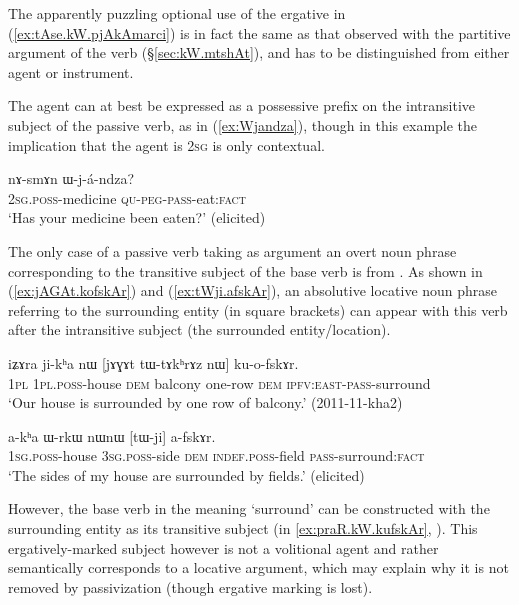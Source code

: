 The apparently puzzling optional use of the ergative in (\ref{ex:tAse.kW.pjAkAmarci}) is in fact the same as that observed with the partitive argument of the verb  (§\ref{sec:kW.mtshAt}), and has to be distinguished from either agent or instrument.

The agent can at best be expressed as a possessive prefix on the intransitive subject of the passive verb, as in (\ref{ex:Wjandza}), though in this example the implication that the agent is \textsc{2sg} is only contextual.

\begin{exe}
\ex \label{ex:Wjandza}
 \gll nɤ-smɤn ɯ-j-á-ndza? \\
 \textsc{2sg}.\textsc{poss}-medicine \textsc{qu}-\textsc{peg}-\textsc{pass}-eat:\textsc{fact} \\
 \glt `Has your medicine been eaten?' (elicited)
\end{exe}

The only case of a passive verb taking as argument an overt noun phrase corresponding to the transitive subject of the base verb is  from . As shown in (\ref{ex:jAGAt.kofskAr}) and (\ref{ex:tWji.afskAr}), an absolutive locative noun phrase referring to the surrounding entity (in square brackets) can appear with this verb after the intransitive subject (the surrounded entity/location).

\begin{exe}
\ex \label{ex:jAGAt.kofskAr}
 \gll iʑɤra ji-kʰa nɯ [jɤɣɤt tɯ-tɤkʰrɤz nɯ] ku-o-fskɤr. \\
 \textsc{1pl} \textsc{1pl}.\textsc{poss}-house \textsc{dem} balcony one-row \textsc{dem} \textsc{ipfv}:\textsc{east}-\textsc{pass}-surround \\
\glt `Our house is surrounded by one row of balcony.' (2011-11-kha2)
\end{exe}

\begin{exe}
\ex \label{ex:tWji.afskAr}
 \gll a-kʰa ɯ-rkɯ nɯnɯ [tɯ-ji] a-fskɤr.\\
\textsc{1sg}.\textsc{poss}-house \textsc{3sg}.\textsc{poss}-side \textsc{dem} \textsc{indef}.\textsc{poss}-field \textsc{pass}-surround:\textsc{fact}\\
\glt `The sides of my house are surrounded by fields.' (elicited)
\end{exe}

However, the base verb   in the meaning `surround' can be constructed with the surrounding entity as its transitive subject (in \ref{ex:praR.kW.kufskAr}, ). This ergatively-marked subject however is not a volitional agent and rather semantically corresponds to a locative argument, which may explain why it is not removed by passivization (though ergative marking is lost).

